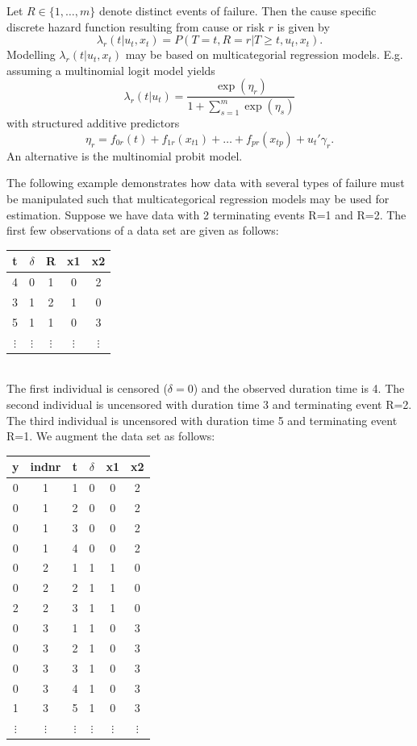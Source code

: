 \documentclass[11pt,a4paper,twoside]{bayesxarticle}
\begin{document}
Let $R \in \{1,\dots,m\}$ denote distinct events of failure. Then
the cause specific discrete hazard function resulting from cause
or risk $r$ is given by
$$
\lambda_{r}(t|u_t,x_t) = P(T=t,R=r|T \geq t, u_t,x_t).
$$
Modelling $\lambda_{r}(t|u_t,x_t)$ may be based on multicategorial
regression models. E.g. assuming a multinomial logit model yields
$$
\lambda_{r}(t|u_t) = \frac{\exp(\eta_{r})}{1+\sum_{s=1}^m
\exp(\eta_s)}
$$
with structured additive predictors
\begin{equation}
\label{gampred3} \eta_{r}=f_{0r}(t) +
f_{1r}(x_{t1})+\dots+f_{pr}(x_{tp})+u_{t}'\gamma_r.
\end{equation}
An alternative is the multinomial probit model.

The following example demonstrates how data with several types of
failure must be manipulated such that multicategorical regression
models may be used for estimation. Suppose we have data with 2
terminating events R=1 and R=2. The first few observations of a
data set are given as follows:
\vspace{0.5cm}\\
\begin{tabular}{c|c|c|c|c}
t & $\delta$ & R & x1 & x2\\\hline\hline 4 & 0    &  1 & 0  &
2\\\hline 3 & 1    &  2 & 1  & 0\\\hline 5 & 1    &  1 & 0  &
3\\\hline
$\vdots$ & $\vdots$ & $\vdots$ & $\vdots$ & $\vdots$\\
\end{tabular}
\vspace{0.5cm}\\
The first individual is censored ($\delta=0$) and the observed
duration time is 4. The second individual is uncensored with
duration time 3 and terminating event R=2. The third individual is
uncensored with duration time 5 and terminating event R=1. We
augment the data set as follows:
\vspace{0.5cm}\\
\begin{tabular}{c|c|c|c|c|c}
y & indnr & t & $\delta$ &  x1 & x2\\\hline\hline
0 &  1  &  1 & 0  &  0 &  2\\
0 &  1  &  2 & 0  &  0 &  2\\
0 &  1  &  3 & 0  &  0 &  2\\
0 &  1  &  4 & 0  &  0 &  2\\\hline
0 &  2  &  1 & 1  &  1 &  0\\
0 &  2  &  2 & 1  &  1 &  0\\
2 &  2  &  3 & 1  &  1 &  0\\\hline
0 &  3  &  1 & 1  &  0 &  3\\
0 &  3  &  2 & 1  &  0 &  3\\
0 &  3  &  3 & 1  &  0 &  3\\
0 &  3  &  4 & 1  &  0 &  3\\
1 &  3  &  5 & 1  &  0 & 3\\\hline
$\vdots$ & $\vdots$ & $\vdots$ & $\vdots$ & $\vdots$ & $\vdots$\\
\end{tabular}
\end{document}
